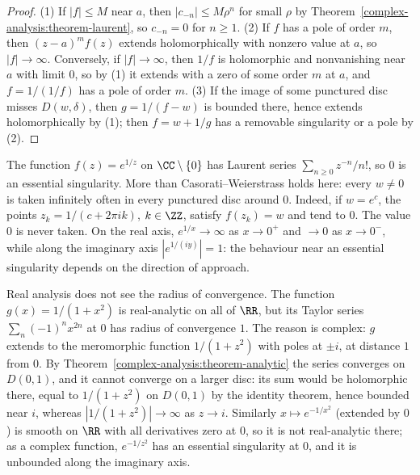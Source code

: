 \begin{proof}
(1) If $|f| \leq M$ near $a$, then $|c_{-n}| \leq M\rho^{n}$ for small $\rho$ by Theorem~\ref{complex-analysis:theorem-laurent}, so $c_{-n} = 0$ for $n \geq 1$. (2) If $f$ has a pole of order $m$, then
$(z - a)^mf(z)$ extends holomorphically with nonzero value at $a$, so $|f| \to \infty$. Conversely, if $|f| \to \infty$, then $1/f$ is holomorphic and nonvanishing near $a$ with limit $0$, so by (1) it extends
with a zero of some order $m$ at $a$, and $f = 1/(1/f)$ has a pole of order $m$. (3) If the image of some punctured disc misses $D(w, \delta)$, then $g = 1/(f - w)$ is bounded there, hence extends
holomorphically by (1); then $f = w + 1/g$ has a removable singularity or a pole by (2).
\end{proof}

\begin{example}\label{complex-analysis:example-essential}
The function $f(z) = e^{1/z}$ on $\CC \setminus \{0\}$ has Laurent series $\sum_{n \geq 0}z^{-n}/n!$, so $0$ is an essential singularity. More than Casorati--Weierstrass holds here: every $w \neq 0$ is taken
infinitely often in every punctured disc around $0$. Indeed, if $w = e^c$, the points $z_k = 1/(c + 2\pi ik)$, $k \in \ZZ$, satisfy $f(z_k) = w$ and tend to $0$. The value $0$ is never taken. On the real axis,
$e^{1/x} \to \infty$ as $x \to 0^+$ and $\to 0$ as $x \to 0^-$, while along the imaginary axis $|e^{1/(iy)}| = 1$: the behaviour near an essential singularity depends on the direction of approach.
\end{example}

\begin{counterexample}\label{complex-analysis:counterexample-real-radius}
Real analysis does not see the radius of convergence. The function $g(x) = 1/(1 + x^2)$ is real-analytic on all of $\RR$, but its Taylor series $\sum_n(-1)^nx^{2n}$ at $0$ has radius of convergence $1$. The reason
is complex: $g$ extends to the meromorphic function $1/(1 + z^2)$ with poles at $\pm i$, at distance $1$ from $0$. By Theorem~\ref{complex-analysis:theorem-analytic} the series converges on $D(0, 1)$, and it cannot converge on a
larger disc: its sum would be holomorphic there, equal to $1/(1 + z^2)$ on $D(0, 1)$ by the identity theorem, hence bounded near $i$, whereas $|1/(1 + z^2)| \to \infty$ as $z \to i$. Similarly $x \mapsto e^{-1/x^2}$ (extended by $0$) is smooth on $\RR$ with all derivatives zero at $0$, so it is not real-analytic there; as a complex function,
$e^{-1/z^2}$ has an essential singularity at $0$, and it is unbounded along the imaginary axis.
\end{counterexample}


